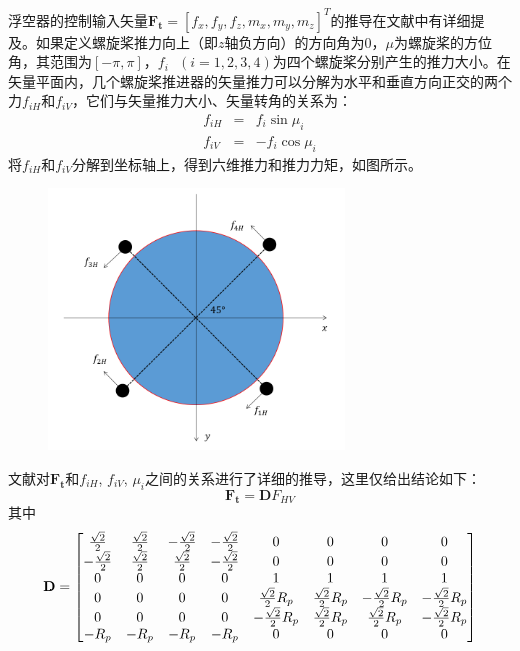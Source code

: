 浮空器的控制输入矢量$\mathbf{F_t}=[f_x, f_y, f_z, m_x, m_y, m_z]^T$的推导在文献中有详细提及。如果定义螺旋桨推力向上（即$z$轴负方向）的方向角为$0$，$\mu$为螺旋桨的方位角，其范围为$[-\pi,\pi]$，$f_i\text{ }(i=1,2,3,4)$为四个螺旋桨分别产生的推力大小。在矢量平面内，几个螺旋桨推进器的矢量推力可以分解为水平和垂直方向正交的两个力$f_{iH}$和$f_{iV}$，它们与矢量推力大小、矢量转角的关系为：
\begin{eqnarray}
f_{iH}&=&f_i\sin\mu_i \\
f_{iV}&=&-f_i\cos\mu_i
\end{eqnarray}
将$f_{iH}$和$f_{iV}$分解到坐标轴上，得到六维推力和推力力矩，如图所示。
\begin{figure}
    \centering
    \includegraphics[width=0.7\textwidth]{figure/controlallocation.png}
\end{figure}
文献对$\mathbf{F_t}$和$f_{iH}$, $f_{iV}$, $\mu_i$之间的关系进行了详细的推导，这里仅给出结论如下：
\begin{equation}
    \mathbf{F_t}=\mathbf{D}F_{HV}
\end{equation}
其中
\begin{equation}\label{eq:D}
    \mathbf{D}=\left[\begin{matrix}
\frac{\sqrt{2}}{2}&\frac{\sqrt{2}}{2}&-\frac{\sqrt{2}}{2}&-\frac{\sqrt{2}}{2}&0&0&0&0\\
-\frac{\sqrt{2}}{2}&\frac{\sqrt{2}}{2}&\frac{\sqrt{2}}{2}&-\frac{\sqrt{2}}{2}&0&0&0&0\\
0&0&0&0&1&1&1&1\\
0&0&0&0&\frac{\sqrt{2}}{2} R_p&\frac{\sqrt{2}}{2} R_p&-\frac{\sqrt{2}}{2} R_p&-\frac{\sqrt{2}}{2} R_p\\
0&0&0&0&-\frac{\sqrt{2}}{2} R_p&\frac{\sqrt{2}}{2} R_p&\frac{\sqrt{2}}{2} R_p&-\frac{\sqrt{2}}{2} R_p\\
-R_p&-R_p&-R_p&-R_p&0&0&0&0\\
\end{matrix}
\right]
\end{equation}

